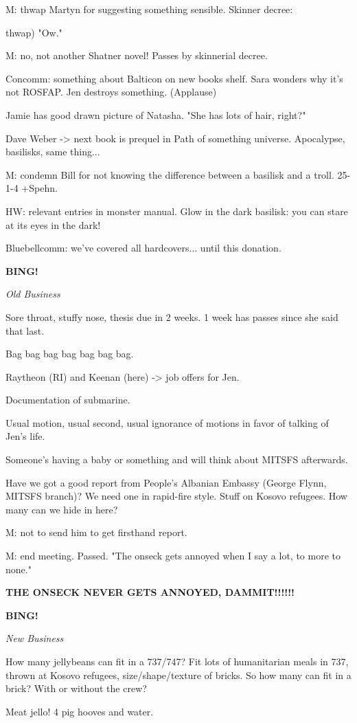 \documentclass[12pt]{article}
\newcommand{\bing}{{\bf BING!} }
\newcommand{\goto}[1]{\bing \vskip 12pt \centerline{{\em{#1}}}}
\begin{document}
M: thwap Martyn for suggesting something sensible. Skinner decree: {thwap) "Ow."

M: no, not another Shatner novel! Passes by skinnerial decree.

Concomm: something about Balticon on new books shelf. Sara wonders why it's not ROSFAP. Jen destroys something. (Applause)

Jamie has good drawn picture of Natasha. "She has lots of hair, right?"

Dave Weber -> next book is prequel in Path of something universe. Apocalypse, basilisks, same thing...

M: condemn Bill for not knowing the difference between a basilisk and a troll. 25-1-4 +Spehn.

HW: relevant entries in monster manual. Glow in the dark basilisk: you can stare at its eyes in the dark!

Bluebellcomm: we've covered all hardcovers... until this donation.

\goto{Old Business}

Sore throat, stuffy nose, thesis due in 2 weeks. 1 week has passes since she said that last.

Bag bag bag bag bag bag bag.

Raytheon (RI) and Keenan (here) -> job offers for Jen.

Documentation of submarine.

Usual motion, usual second, usual ignorance of motions in favor of talking of Jen's life.

Someone's having a baby or something and will think about MITSFS afterwards.

Have we got a good report from People's Albanian Embassy (George Flynn, MITSFS branch)? We need one in rapid-fire style. Stuff on Kosovo refugees. How many can we hide in here?

M: not to send him to get firsthand report.

M: end meeting. Passed. "The onseck gets annoyed when I say a lot, to more to none."

{\bf THE ONSECK NEVER GETS ANNOYED, DAMMIT!!!!!!}

\goto{New Business}

How many jellybeans can fit in a 737/747? Fit lots of humanitarian meals in 737, thrown at Kosovo refugees, size/shape/texture of bricks. So how many can fit in a brick? With or without the crew?

Meat jello! 4 pig hooves and water.

}
\end{document}
